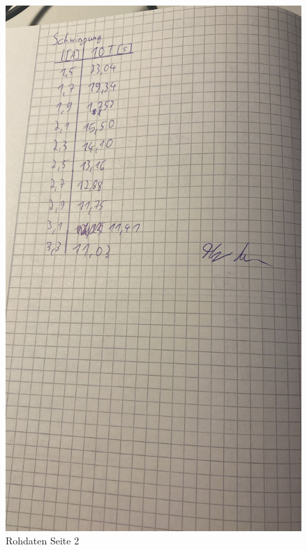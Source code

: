 \begin{figure}
  \includegraphics[width=\textwidth]{Bilder/data2.jpg}
  \caption{Rohdaten Seite 2}
\end{figure}



